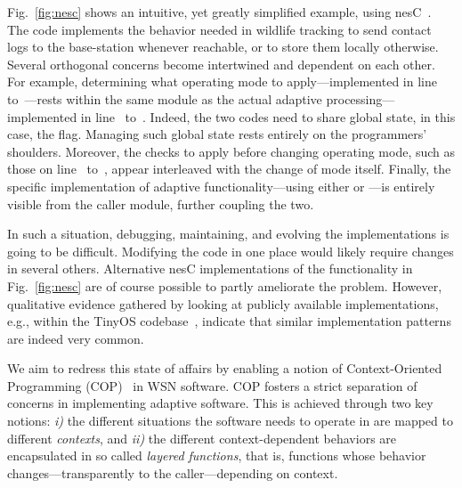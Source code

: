
Fig.~\ref{fig:nesc} shows an intuitive, yet greatly simplified
example, using nesC~\cite{gay03nesc}. The code implements the behavior
needed in wildlife tracking to send contact logs to the base-station
whenever reachable, or to store them locally otherwise. Several
orthogonal concerns become intertwined and dependent on each
other. For example, determining what operating mode to
apply---implemented in line~
to~---rests within the same module as the actual
adaptive processing---implemented in line~
to~. Indeed, the two codes need to share global state,
in this case, the  flag. Managing such
global state rests entirely on the programmers' shoulders. Moreover,
the checks to apply before changing operating mode, such as those on
line~ to~, appear interleaved with the
change of mode itself. Finally, the specific implementation of
adaptive functionality---using either  or
---is entirely visible from the caller module,
further coupling the two.

In such a situation, debugging, maintaining, and evolving the
implementations is going to be difficult. Modifying the code in one
place would likely require changes in several others. Alternative nesC
implementations of the functionality in Fig.~\ref{fig:nesc} are of
course possible to partly ameliorate the problem. However, qualitative
evidence gathered by looking at publicly available implementations,
e.g., within the TinyOS codebase~\cite{tinyos}, indicate that similar
implementation patterns are indeed very common.


 We aim to redress this state of
affairs by enabling a notion of Context-Oriented Programming
(COP)~\cite{Hirschfeld08} in WSN software. COP fosters a strict
separation of concerns in implementing adaptive software. This is
achieved through two key notions: \emph{i)} the different situations
the software needs to operate in are mapped to different
\emph{contexts}, and \emph{ii)} the different context-dependent
behaviors are encapsulated in so called \emph{layered functions}, that
is, functions whose behavior changes---transparently to the
caller---depending on context.

